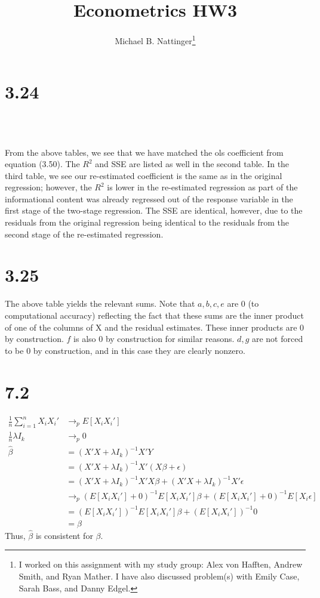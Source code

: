 \documentclass[11pt]{article} %
\title{Econometrics HW3}
\author{Michael B. Nattinger\footnote{I worked on this assignment with my study group: Alex von Hafften, Andrew Smith, and Ryan Mather. I have also discussed problem(s) with Emily Case, Sarah Bass, and Danny Edgel.}}
\begin{document}
\maketitle

\section{3.24}
\begin{center}
\\
\\

\end{center}
From the above tables, we see that we have matched the ols coefficient from equation (3.50). The $R^2$ and SSE are listed as well in the second table. In the third table, we see our re-estimated coefficient is the same as in the original regression; however, the $R^2$ is lower in the re-estimated regression as part of the informational content was already regressed out of the response variable in the first stage of the two-stage regression. The SSE are identical, however, due to the residuals from the original regression being identical to the residuals from the second stage of the re-estimated regression.
\section{3.25}
\begin{center}

\end{center}
The above table yields the relevant sums. Note that $a,b,c,e$ are 0 (to computational accuracy) reflecting the fact that these sums are the inner product of one of the columns of X and the residual estimates. These inner products are 0 by construction. $f$ is also 0 by construction for similar reasons. $d,g$ are not forced to be 0 by construction, and in this case they are clearly nonzero.

\section{7.2}
\begin{align*}
\frac{1}{n}\sum_{i=1}^n X_i X_i' &\rightarrow_p E[X_iX_i']\\
\frac{1}{n}\lambda I_k &\rightarrow_p 0\\
\hat{\beta} &= (X'X + \lambda I_k)^{-1}X'Y \\
&= (X'X + \lambda I_k)^{-1}X'(X\beta + \epsilon) \\
&= (X'X + \lambda I_k)^{-1}X'X\beta + (X'X + \lambda I_k)^{-1}X'\epsilon\\
&\rightarrow_p \left( E[X_iX_i'] + 0 \right)^{-1} E[X_iX_i']\beta + (E[X_iX_i']+0)^{-1}E[X_i\epsilon] \\
&= \left( E[X_iX_i'] \right)^{-1} E[X_iX_i']\beta + \left( E[X_iX_i'] \right)^{-1} 0\\
&= \beta
\end{align*}
Thus, $\hat{\beta}$ is consistent for $\beta$.
\end{document}
